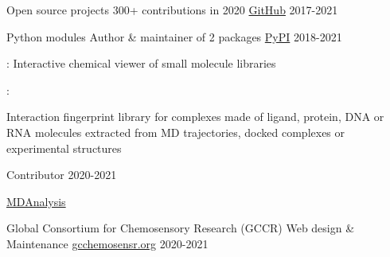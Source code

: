 
\begin{cventries}

  \cventry
    {Open source projects}
    {300+ contributions in 2020}
    {\href{https://github.com/cbouy/}{GitHub}}
    {2017-2021}
    {}

  \cventry
    {Python modules}
    {Author \& maintainer of 2 packages}
    {\href{https://pypi.org/user/cbouy/}{PyPI}}
    {2018-2021}
    {
      \begin{cvitems}
        \item{: Interactive chemical viewer of small molecule libraries}
        \item{: \parbox[t]{.7\textwidth}{Interaction fingerprint library for complexes made of ligand, protein, DNA or RNA molecules extracted from MD trajectories, docked complexes or experimental structures}}
      \end{cvitems}
    }
  
  \vspace{.3em}
  \cventry
    {}
    {Contributor}
    {}
    {2020-2021}
    {
      \begin{cvitems}
        \item{\href{https://github.com/MDAnalysis/mdanalysis/commits?author=cbouy}{MDAnalysis}}
      \end{cvitems}
    }

  \cventry
    {Global Consortium for Chemosensory Research (GCCR)}
    {Web design \& Maintenance}
    {\href{https://gcchemosensr.org/}{gcchemosensr.org}}
    {2020-2021}
    {}

\end{cventries}
